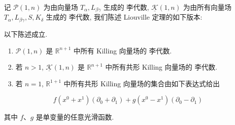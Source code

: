 记 $\mathcal{P}(1, n)$ 为由向量场 $T_{\alpha}, L_{\beta\gamma}$ 生成的 李代数, $\underline{\mathcal{K}}(1, n)$ 为由所有向量场 $T_{\alpha}, L_{\beta\gamma}, S, K_{\delta}$ 生成的 李代数, 我们陈述 Liouville 定理的如下版本:

\begin{theorem}\label{thm:cA-4.3}
以下陈述成立.

\begin{enumerate}
\renewcommand{\labelenumi}{\arabic{enumi})}
\item $\mathcal{P}(1, n)$ 是 $\mathbb{R}^{n+1}$ 中所有 Killing 向量场的 李代数.
\item 若 $n > 1$, $\underline{\mathcal{K}}(1, n)$ 是 $\mathbb{R}^{n+1}$ 中所有共形 Killing 向量场的 李代数.
\item 若 $n = 1$, $\mathbb{R}^{1+1}$ 中所有共形 Killing 向量场的集合由如下表达式给出
\end{enumerate}

\[
f(x^{0} + x^{1})(\partial_{0} + \partial_{1}) + g(x^{0} - x^{1})(\partial_{0} - \partial_{1})
\]

其中 $f$、$g$ 是单变量的任意光滑函数.
\end{theorem}

